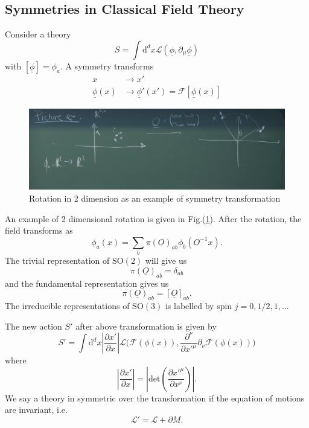 \documentclass[a4paper,11pt]{article}
\begin{document}
\subsection{Symmetries in Classical Field Theory}
Consider a theory
\begin{equation}
    S=\int\mathrm{d}^dx\mathcal{L}(\underline{\phi},\partial_\mu\underline{\phi})
\end{equation}
with $[\underline{\phi}]=\phi_a$. A symmetry transforms
\begin{equation}
\begin{aligned}
x&\rightarrow x'\\
\underline{\phi}(x)&\rightarrow\underline{\phi}'(x')=\mathcal{F}[\underline{\phi}(x)]
\end{aligned}
\end{equation}
\begin{figure}
    \centering
    \includegraphics[scale=0.3]{2drotation.jpg}
    \caption{Rotation in 2 dimension as an example of symmetry transformation}
    \label{2drotation}
\end{figure}
An example of 2 dimensional rotation is given in Fig.(\ref{2drotation}). After the rotation, the field transforms as
\begin{equation}
    \phi_a(x)=\sum_b\pi(\underline{O})_{ab}\phi_b(\underline{O}^{-1}x).
\end{equation}
The trivial representation of $\mathrm{SO}(2)$ will give us
\begin{equation}
    \pi(\underline{O})_{ab}=\delta_{ab}
\end{equation}
and the fundamental representation gives us
\begin{equation}
    \pi(\underline{O})_{ab}=[\underline{O}]_{ab}.
\end{equation}
The irreducible representations of $\mathrm{SO}(3)$ is labelled by spin $j=0,1/2,1,...$

The new action $S'$ after above transformation is given by
\begin{equation}
    S'=\int\mathrm{d}^dx\left|\frac{\partial x'}{\partial x}\right|\mathcal{L}\bigg(\mathcal{F}(\phi(x)),\frac{\partial^{\nu}}{\partial x'^{\mu}}\partial_\nu\mathcal{F}(\phi(x))\bigg)
\end{equation}
where 
\begin{equation}
    \left|\frac{\partial x'}{\partial x}\right|=\left|\mathrm{det}(\frac{\partial x'^\mu}{\partial x^\nu})\right|.
\end{equation}
We say a theory in symmetric over the transformation if the equation of motions are invariant, i.e.
\begin{equation}
    \mathcal{L}'=\mathcal{L}+\partial M.
\end{equation}
\end{document}
